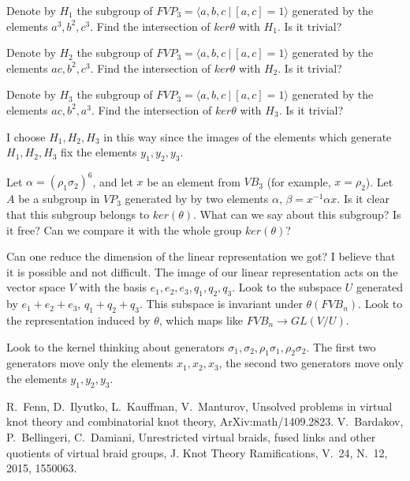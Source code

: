 \documentclass{article}
\begin{document}
Denote by $H_1$ the subgroup of $FVP_3=\langle a,b,c~|~[a,c]=1\rangle$ generated by the elements $a^3,b^2,c^3$. Find the intersection of $ker{\theta}$ with $H_1$. Is it trivial?

Denote by $H_2$ the subgroup of $FVP_3=\langle a,b,c~|~[a,c]=1\rangle$ generated by the elements $ac,b^2,c^3$. Find the intersection of $ker{\theta}$ with $H_2$. Is it trivial?

Denote by $H_3$ the subgroup of $FVP_3=\langle a,b,c~|~[a,c]=1\rangle$ generated by the elements $ac,b^2,a^3$. Find the intersection of $ker{\theta}$ with $H_3$. Is it trivial?

I choose $H_1,H_2,H_3$ in this way since the images of the elements which generate $H_1,H_2,H_3$ fix the elements $y_1,y_2,y_3$. 

Let $\alpha=(\rho_1\sigma_2)^6$, and let $x$ be an element from $VB_3$ (for example, $x=\rho_2$). Let $A$ be a subgroup in $VP_3$ generated by by two elements $\alpha$, $\beta=x^{-1}\alpha x$. Is it clear that this subgroup belongs to $ker(\theta)$. What can we say about this subgroup? Is it free? Can we compare it with the whole group $ker(\theta)$?

Can one reduce the dimension of the linear representation we got? I believe that it is possible and not difficult. The image of our linear representation acts on the vector space $V$ with the basis $e_1,e_2,e_3,q_1,q_2,q_3$. Look to the subspace $U$ generated by $e_1+e_2+e_3$, $q_1+q_2+q_3$. This subspace is invariant under $\theta(FVB_n)$. Look to the representation induced by $\theta$, which maps like $FVB_n\to GL(V/U)$.

Look to the kernel thinking about generators $\sigma_1, \sigma_2, \rho_1\sigma_1,\rho_2\sigma_2$. The first two generators move only the elements $x_1,x_2,x_3$, the second two generators move only the elements $y_1,y_2,y_3$.

\begin{thebibliography}{00}
R.~Fenn, D.~Ilyutko, L.~Kauffman, V.~Manturov, Unsolved problems in virtual knot theory and combinatorial knot theory, ArXiv:math/1409.2823.
V.~Bardakov, P.~Bellingeri, C.~Damiani, Unrestricted virtual braids, fused links and other quotients of virtual braid groups, J. Knot Theory Ramifications, V.~24, N.~12, 2015, 1550063.
\end{thebibliography}
\end{document}

